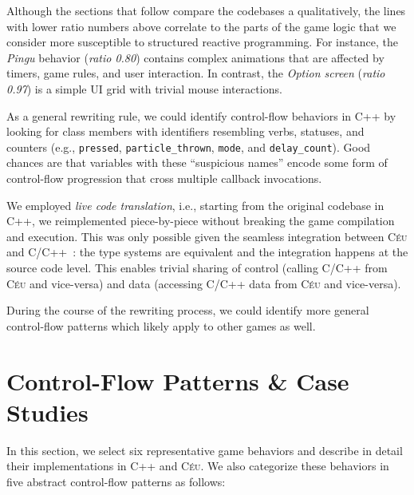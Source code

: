 \documentclass{vgtc}                          %
\newcommand{\CEU}{\textsc{C\'{e}u}\xspace}
\newcommand{\code}[1] {{\small{\texttt{#1}}}}
\begin{document}
Although the sections that follow compare the codebases a qualitatively, the
lines with lower ratio numbers above correlate to the parts of the game logic
that we consider more susceptible to structured reactive programming.
For instance, the \emph{Pingu} behavior (\emph{ratio 0.80}) contains complex
animations that are affected by timers, game rules, and user interaction.
In contrast, the \emph{Option screen} (\emph{ratio 0.97}) is a simple UI grid
with trivial mouse interactions.

As a general rewriting rule, we could identify control-flow behaviors in C++ by
looking for class members with identifiers resembling verbs, statuses, and
counters (e.g.,
\code{pressed},
\code{particle\_thrown},
\code{mode}, and
\code{delay\_count}).
Good chances are that variables with these ``suspicious names'' encode some
form of control-flow progression that cross multiple callback invocations.

We employed \emph{live code translation}, i.e., starting from the original
codebase in C++, we reimplemented piece-by-piece without breaking the game
compilation and execution.
%
This was only possible given the seamless integration between \CEU and
C/C++~\cite{ceu.sensys13}: the type systems are equivalent and the integration
happens at the source code level.
This enables trivial sharing of control (calling C/C++ from \CEU and
vice-versa) and data (accessing C/C++ data from \CEU and vice-versa).

During the course of the rewriting process, we could identify more general
control-flow patterns which likely apply to other games as well.

\section{Control-Flow Patterns \& Case Studies}
\label{sec.pats}

In this section, we select six representative game behaviors and describe in
detail their implementations in C++ and \CEU.
%
We also categorize these behaviors in five abstract control-flow patterns as
follows:
\end{document}
